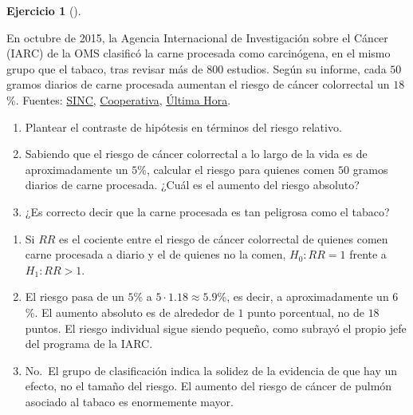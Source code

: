 \documentclass[
  spanish,
  a4paper,
]{scrreport}
\theoremstyle{definition}
\newtheorem{exercise}{Ejercicio}[chapter]
\theoremstyle{remark}
\begin{document}
\begin{exercise}[]\protect\hypertarget{exr-interpretacion-carne-procesada}{}\label{exr-interpretacion-carne-procesada}

En octubre de 2015, la Agencia Internacional de Investigación sobre el
Cáncer (IARC) de la OMS clasificó la carne procesada como carcinógena,
en el mismo grupo que el tabaco, tras revisar más de \(800\) estudios.
Según su informe, cada \(50\) gramos diarios de carne procesada aumentan
el riesgo de cáncer colorrectal un \(18\)\%. Fuentes:
\href{https://cdn.agenciasinc.es/print/93530}{SINC},
\href{https://www.cooperativa.cl/noticias/site/artic/20151026/pags-amp/20151026102415.html}{Cooperativa},
\href{https://www.ultimahora.es/noticias/sociedad/2023/02/13/1877819/par-salchichas-semana-aumentan-riesgo-cancer.html}{Última
Hora}.

\begin{enumerate}
\def\labelenumi{\alph{enumi}.}
\item
  Plantear el contraste de hipótesis en términos del riesgo relativo.
\item
  Sabiendo que el riesgo de cáncer colorrectal a lo largo de la vida es
  de aproximadamente un \(5\)\%, calcular el riesgo para quienes comen
  \(50\) gramos diarios de carne procesada. ¿Cuál es el aumento del
  riesgo absoluto?
\item
  ¿Es correcto decir que la carne procesada es tan peligrosa como el
  tabaco?
\end{enumerate}

\end{exercise}

\begin{tcolorbox}[enhanced jigsaw, arc=.35mm, bottomrule=.15mm, bottomtitle=1mm, breakable, colback=white, colbacktitle=quarto-callout-tip-color!10!white, colframe=quarto-callout-tip-color-frame, coltitle=black, left=2mm, leftrule=.75mm, opacityback=0, opacitybacktitle=0.6, rightrule=.15mm, title=\textcolor{quarto-callout-tip-color}{\faLightbulb}\hspace{0.5em}{Solución}, titlerule=0mm, toprule=.15mm, toptitle=1mm]

\begin{enumerate}
\def\labelenumi{\alph{enumi}.}
\item
  Si \(RR\) es el cociente entre el riesgo de cáncer colorrectal de
  quienes comen carne procesada a diario y el de quienes no la comen,
  \(H_0: RR=1\) frente a \(H_1: RR>1\).
\item
  El riesgo pasa de un \(5\)\% a \(5\cdot 1.18\approx 5.9\)\%, es decir,
  a aproximadamente un \(6\)\%. El aumento absoluto es de alrededor de
  \(1\) punto porcentual, no de \(18\) puntos. El riesgo individual
  sigue siendo pequeño, como subrayó el propio jefe del programa de la
  IARC.
\item
  No.~El grupo de clasificación indica la solidez de la evidencia de que
  hay un efecto, no el tamaño del riesgo. El aumento del riesgo de
  cáncer de pulmón asociado al tabaco es enormemente mayor.
\end{enumerate}

\end{tcolorbox}
\end{document}
